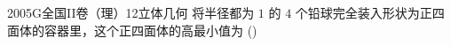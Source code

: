 
\begin{problem}{2005}{G}{全国II卷（理）}{12}{立体几何}
将半径都为 $1$ 的 $4$ 个铅球完全装入形状为正四面体的容器里，这个正四面体的高最小值为 (\hspace{1cm})
\begin{choices}
\end{choices}
\end{problem}

\begin{answer}

\end{answer}

\begin{solutions}

\end{solutions}